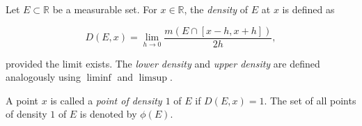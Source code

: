 Let $E \subset \mathbb{R}$ be a measurable set. For $x \in \mathbb{R}$, the \textit{density} of $E$ at $x$ is defined as

$$
D(E, x) = \lim_{h \to 0} \frac{m(E \cap [x - h, x + h])}{2h},
$$

provided the limit exists. The \textit{lower density} and \textit{upper density} are defined analogously using $\liminf$ and $\limsup$.

A point $x$ is called a \textit{point of density $1$} of $E$ if $D(E, x) = 1$. The set of all points of density $1$ of $E$ is denoted by $\phi(E)$.
